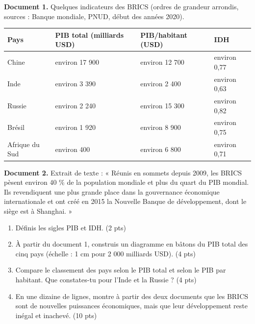 \documentclass[11pt]{article}
\begin{document}
\begin{exercice}
\textbf{Document 1.} Quelques indicateurs des BRICS (ordres de grandeur arrondis, sources : Banque mondiale, PNUD, début des années 2020).

\begin{center}
\begin{tabularx}{\linewidth}{|l|X|X|X|}\hline
\rowcolor{popblueL} \textbf{Pays} & \textbf{PIB total (milliards USD)} & \textbf{PIB/habitant (USD)} & \textbf{IDH} \\ \hline
Chine & environ 17 900 & environ 12 700 & environ 0,77 \\ \hline
Inde & environ 3 390 & environ 2 400 & environ 0,63 \\ \hline
Russie & environ 2 240 & environ 15 300 & environ 0,82 \\ \hline
Brésil & environ 1 920 & environ 8 900 & environ 0,75 \\ \hline
Afrique du Sud & environ 400 & environ 6 800 & environ 0,71 \\ \hline
\end{tabularx}
\end{center}

\textbf{Document 2.} Extrait de texte : « Réunis en sommets depuis 2009, les BRICS pèsent environ 40 \% de la population mondiale et plus du quart du PIB mondial. Ils revendiquent une plus grande place dans la gouvernance économique internationale et ont créé en 2015 la Nouvelle Banque de développement, dont le siège est à Shanghai. »

\begin{enumerate}
\item Définis les sigles PIB et IDH. (2 pts)
\item À partir du document 1, construis un diagramme en bâtons du PIB total des cinq pays (échelle : 1 cm pour 2 000 milliards USD). (4 pts)
\item Compare le classement des pays selon le PIB total et selon le PIB par habitant. Que constates-tu pour l'Inde et la Russie ? (4 pts)
\item En une dizaine de lignes, montre à partir des deux documents que les BRICS sont de nouvelles puissances économiques, mais que leur développement reste inégal et inachevé. (10 pts)
\end{enumerate}
\end{exercice}
\end{document}
